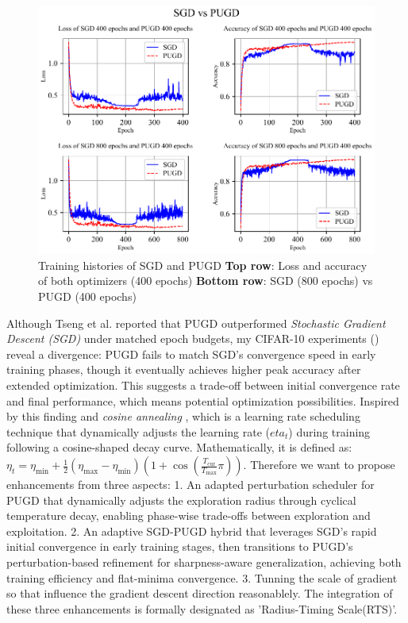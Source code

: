 \documentclass[10pt,twocolumn,letterpaper]{article}
\begin{document}
\begin{figure}[htbp]
	\center
	\includegraphics[width=\columnwidth]{images/SGDvsPUGD.pdf}
	\caption{Training histories of SGD and PUGD
    \textbf{Top row}: Loss and accuracy of both optimizers (400 epochs)
    \textbf{Bottom row}: SGD (800 epochs) vs PUGD (400 epochs)}
	\label{fig:SGDvsPUGD}
\end{figure}
Although Tseng et al. \cite{Tseng_2022} reported that PUGD outperformed \textit{Stochastic Gradient Descent (SGD)} \cite{4308316} under matched epoch budgets, my CIFAR-10 experiments () reveal a divergence: PUGD fails to match SGD's convergence speed in early training phases, though it eventually achieves higher peak accuracy after extended optimization. This suggests a trade-off between initial convergence rate and final performance, which means potential optimization possibilities.
Inspired by this finding and \textit{cosine annealing} \cite{loshchilov2017sgdrstochasticgradientdescent}, which is a learning rate scheduling technique that dynamically adjusts the learning rate ($eta_t$) during training following a cosine-shaped decay curve. Mathematically, it is defined as: $\eta_t = \eta_{\min} + \frac{1}{2}(\eta_{\max} - \eta_{\min})\left(1 + \cos\left(\frac{T_{\text{cur}}}{T_{\max}}\pi\right)\right)$. Therefore we want to propose enhancements from three aspects: 1. An adapted perturbation scheduler for PUGD that dynamically adjusts the exploration radius through cyclical temperature decay, enabling phase-wise trade-offs between exploration and exploitation. 2. An adaptive SGD-PUGD hybrid that leverages SGD's rapid initial convergence in early training stages, then transitions to PUGD's perturbation-based refinement for sharpness-aware generalization, achieving both training efficiency and flat-minima convergence. 3. Tunning the scale of gradient so that influence the gradient descent direction reasonablely. The integration of these three enhancements is formally designated as 'Radius-Timing Scale(RTS)'.
\end{document}
